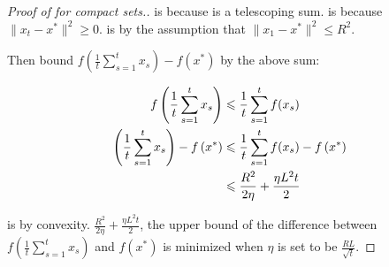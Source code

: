 \begin{proof}[Proof of  for compact sets.]
 is because  is a telescoping sum.
 is because $\lVert x_{t} - x^* \rVert^2 \geq 0$.
 is by the assumption that $\lVert x_1 - x^* \rVert^2 \leq R^2$.

Then bound $f\left(\frac{1}{t}\sum_{s=1}^t x_s\right) - f\left(x^*\right)$ by
the above sum:

\begin{align}
    f\left(\frac{1}{t}\sum_{s=1}^t x_s\right) &\leq \frac{1}{t} \sum_{s=1}^t f(x_s) \equationlabel{k} \\
    \left(\frac{1}{t}\sum_{s=1}^t x_s\right) - f\left(x^*\right) &\leq \frac{1}{t} \sum_{s=1}^t f(x_s) - f\left(x^*\right) \equationlabel{l} \\
    &\leq \frac{R^2}{2\eta} + \frac{\eta L^2 t}{2}
\end{align}

 is by convexity. $\frac{R^2}{2\eta} + \frac{\eta L^2 t}{2}$,
the upper bound of the difference between $f\left(\frac{1}{t}\sum_{s=1}^t
x_s\right)$ and $f\left(x^*\right)$ is minimized when $\eta$ is set to be
$\frac{RL}{\sqrt{t}}$. 


\end{proof}
